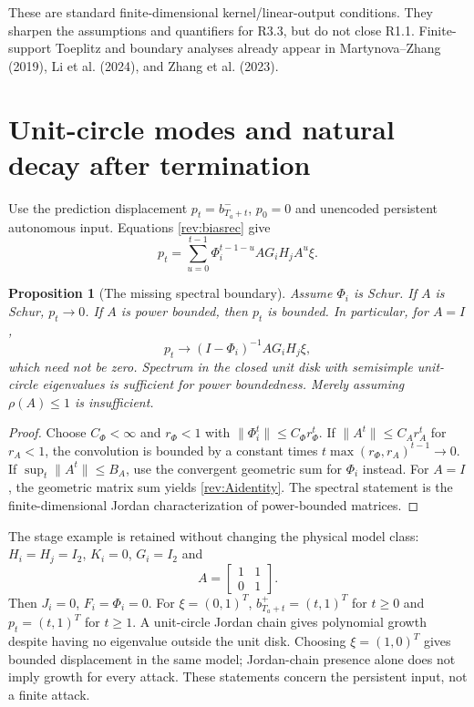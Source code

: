 \documentclass[11pt,a4paper]{article}
\newtheorem{proposition}{Proposition}
\begin{document}
These are standard finite-dimensional kernel/linear-output conditions.
They sharpen the assumptions and quantifiers for R3.3, but do not close
R1.1. Finite-support Toeplitz and boundary analyses already appear in
Martynova--Zhang (2019), Li et al. (2024), and Zhang et al. (2023).

\section{Unit-circle modes and natural decay after termination}
\label{rev:unitcircle}
Use the prediction displacement $p_t=b_{T_a+t}^-$, $p_0=0$ and
unencoded persistent autonomous input. Equations \eqref{rev:biasrec} give
\begin{equation}
 p_t=\sum_{u=0}^{t-1}\Phi_i^{t-1-u}AG_iH_jA^u\xi.
 \label{rev:convolution}
\end{equation}

\begin{proposition}[The missing spectral boundary]
\label{rev:bounded}
Assume $\Phi_i$ is Schur. If $A$ is Schur, $p_t\to0$.
If $A$ is power bounded, then $p_t$ is bounded. In particular, for $A=I$,
\begin{equation}
 p_t\longrightarrow(I-\Phi_i)^{-1}AG_iH_j\xi,\label{rev:Aidentity}
\end{equation}
which need not be zero. Spectrum in the closed unit disk with semisimple
unit-circle eigenvalues is sufficient for power boundedness. Merely
assuming $\rho(A)\le1$ is insufficient.
\end{proposition}
\begin{proof}
Choose $C_\Phi<\infty$ and $r_\Phi<1$ with
$\|\Phi_i^t\|\le C_\Phi r_\Phi^t$. If
$\|A^t\|\le C_A r_A^t$ for $r_A<1$, the convolution is bounded
by a constant times $t\max(r_\Phi,r_A)^{t-1}\to0$.
If $\sup_t\|A^t\|\le B_A$, use the convergent geometric sum for
$\Phi_i$ instead. For $A=I$, the geometric matrix sum yields
\eqref{rev:Aidentity}. The spectral statement is the finite-dimensional
Jordan characterization of power-bounded matrices.
\end{proof}

The stage example is retained without changing the physical model class:
$H_i=H_j=I_2$, $K_i=0$, $G_i=I_2$ and
\[
 A=\begin{bmatrix}1&1\\0&1\end{bmatrix}.
\]
Then $J_i=0$, $F_i=\Phi_i=0$. For $\xi=(0,1)^T$,
$b_{T_a+t}^+=(t,1)^T$ for $t\ge0$ and
$p_t=(t,1)^T$ for $t\ge1$. A unit-circle Jordan chain gives polynomial
growth despite having no eigenvalue outside the unit disk.
Choosing $\xi=(1,0)^T$ gives bounded displacement in the same model;
Jordan-chain presence alone does not imply growth for every attack.
These statements concern the persistent input, not a finite attack.
\end{document}
